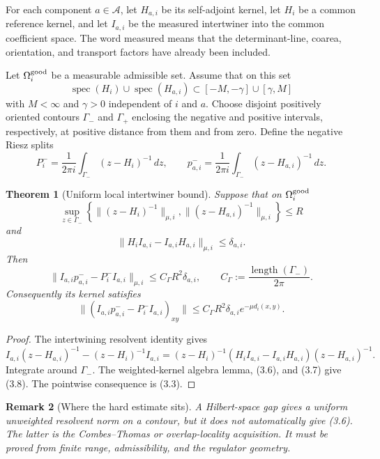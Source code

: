 \documentclass[11pt]{article}
\newtheorem{theorem}{Theorem}[section]
\newtheorem{remark}[theorem]{Remark}
\newcommand{\spec}{\operatorname{spec}}
\begin{document}
For each component \(a\in\mathscr A\), let \(H_{a,i}\) be its
self-adjoint kernel, let \(H_i\) be a common reference kernel, and let
\(I_{a,i}\) be the measured intertwiner into the common coefficient
space.  The word measured means that the determinant-line, coarea,
orientation, and transport factors have already been included.

Let \(\Omega_i^{\rm good}\) be a measurable admissible set.  Assume that
on this set
\[
 \spec(H_i)\cup\spec(H_{a,i})
 \subset [-M,-\gamma]\cup[\gamma,M]
 \tag{3.4}
\]
with \(M<\infty\) and \(\gamma>0\) independent of \(i\) and \(a\).
Choose disjoint positively oriented contours
\(\Gamma_-\) and \(\Gamma_+\) enclosing the negative and positive
intervals, respectively, at positive distance from them and from zero.
Define the negative Riesz splits
\[
 P_i^-=\frac{1}{2\pi i}\int_{\Gamma_-}(z-H_i)^{-1}\,dz,
 \qquad
 p_{a,i}^-=\frac{1}{2\pi i}
 \int_{\Gamma_-}(z-H_{a,i})^{-1}\,dz.
 \tag{3.5}
\]

\begin{theorem}[Uniform local intertwiner bound]
\label{thm:v11v3-local-intertwiner}
Suppose that on \(\Omega_i^{\rm good}\)
\[
 \sup_{z\in\Gamma_-}
 \left\{
 \|(z-H_i)^{-1}\|_{\mu,i},
 \|(z-H_{a,i})^{-1}\|_{\mu,i}
 \right\}
 \leq R
 \tag{3.6}
\]
and
\[
 \|H_iI_{a,i}-I_{a,i}H_{a,i}\|_{\mu,i}
 \leq\delta_{a,i}.
 \tag{3.7}
\]
Then
\[
 \|I_{a,i}p_{a,i}^- -P_i^-I_{a,i}\|_{\mu,i}
 \leq
 C_\Gamma R^2\delta_{a,i},
 \qquad
 C_\Gamma:=\frac{\operatorname{length}(\Gamma_-)}{2\pi}.
 \tag{3.8}
\]
Consequently its kernel satisfies
\[
 \|(I_{a,i}p_{a,i}^- -P_i^-I_{a,i})_{xy}\|
 \leq
 C_\Gamma R^2\delta_{a,i}e^{-\mu d_i(x,y)}.
 \tag{3.9}
\]
\end{theorem}

\begin{proof}
The intertwining resolvent identity gives
\[
 I_{a,i}(z-H_{a,i})^{-1}-(z-H_i)^{-1}I_{a,i}
 =
 (z-H_i)^{-1}
 (H_iI_{a,i}-I_{a,i}H_{a,i})
 (z-H_{a,i})^{-1}.
\]
Integrate around \(\Gamma_-\).  The weighted-kernel algebra lemma,
(3.6), and (3.7) give (3.8).  The pointwise consequence is (3.3).
\end{proof}

\begin{remark}[Where the hard estimate sits]
\label{rem:v11v3-hard-estimate}
A Hilbert-space gap gives a uniform unweighted resolvent norm on a contour,
but it does not automatically give (3.6).  The latter is the
Combes--Thomas or overlap-locality acquisition.  It must be proved from
finite range, admissibility, and the regulator geometry.
\end{remark}
\end{document}
